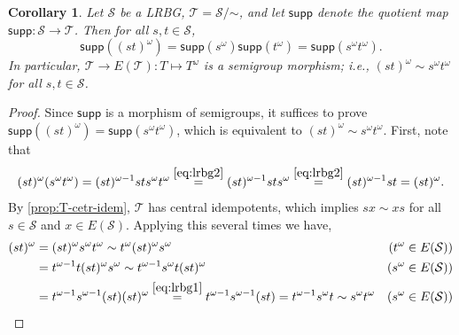 \documentclass[11pt, oneside, reqno]{amsart}
\newtheorem{cor}[theorem]{Corollary}
\theoremstyle{definition}
\numberwithin{equation}{section}
\def \SS{{\mathcal{S}}}
\def \TT{{\mathcal{T}}}
\def \supp{\mathsf{supp}}
\begin{document}
\begin{cor}
    \label{LRBG-supp-and-omega}
    Let $\SS$ be a LRBG, $\TT = \SS/\mathord{\sim}$,
    and let $\supp$ denote the quotient map $\supp: \SS \to \TT$.
    Then for all $s, t \in \SS$,
    \begin{equation*}
        \supp\left((st)^\omega\right)
        = \supp(s^\omega) \supp(t^\omega)
        = \supp(s^\omega t^\omega).
    \end{equation*}
    In particular, $\TT \to E(\TT) : T \mapsto T^\omega$ is a semigroup
    morphism; i.e., $(st)^\omega \sim s^\omega t^\omega$ for all $s, t \in \SS$.
\end{cor}

\begin{proof}
    Since $\supp$ is a morphism of semigroups,
    it suffices to prove
    $\supp\left((st)^\omega\right)
    = \supp(s^\omega t^\omega)$,
    which is equivalent to
    $(st)^\omega \sim s^\omega t^\omega$.
    First, note that
    \begin{equation*}
        (st)^\omega (s^\omega t^\omega)
        = (st)^{\omega - 1} st s^\omega t^\omega
        \overset{\cref{eq:lrbg2}}{=}
        (st)^{\omega - 1} st s^\omega
        \overset{\cref{eq:lrbg2}}{=}
        (st)^{\omega - 1} st
        = (st)^\omega.
    \end{equation*}
    By \cref{prop:T-cetr-idem}, $\TT$ has central idempotents, which implies
    $sx \sim xs$ for all $s \in \SS$ and $x \in E(\SS)$.
    Applying this several times we have,
    \begin{equation*}
        \begin{aligned}[b]
            (st)^\omega
            & =
            (st)^\omega s^\omega t^\omega
            \sim
            t^\omega (st)^\omega s^\omega
            & (t^\omega \in E(\SS))
            \\
            & =
            t^{\omega-1} t (st)^\omega s^\omega
            \sim
            t^{\omega-1} s^\omega t (st)^\omega
            & (s^\omega \in E(\SS))
            \\
            & =
            t^{\omega-1} s^{\omega-1} (st) (st)^\omega
            \overset{\cref{eq:lrbg1}}{=}
            t^{\omega-1} s^{\omega-1} (st)
            =
            t^{\omega-1} s^{\omega} t
            \sim
            s^{\omega} t^{\omega}
            & (s^\omega \in E(\SS))
        \end{aligned}
            \qedhere
    \end{equation*}
\end{proof}
\end{document}
